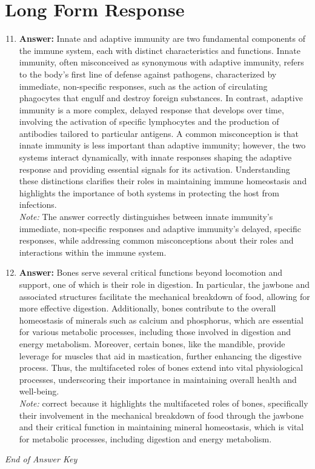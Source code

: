 \documentclass[12pt]{article}
\begin{document}
\section*{Long Form Response}
\begin{enumerate}[label=\arabic*.]
\setcounter{enumi}{10}
\item \textbf{Answer:} Innate and adaptive immunity are two fundamental components of the immune system, each with distinct characteristics and functions. Innate immunity, often misconceived as synonymous with adaptive immunity, refers to the body's first line of defense against pathogens, characterized by immediate, non-specific responses, such as the action of circulating phagocytes that engulf and destroy foreign substances. In contrast, adaptive immunity is a more complex, delayed response that develops over time, involving the activation of specific lymphocytes and the production of antibodies tailored to particular antigens. A common misconception is that innate immunity is less important than adaptive immunity; however, the two systems interact dynamically, with innate responses shaping the adaptive response and providing essential signals for its activation. Understanding these distinctions clarifies their roles in maintaining immune homeostasis and highlights the importance of both systems in protecting the host from infections.
\\ \textit{Note:} The answer correctly distinguishes between innate immunity's immediate, non-specific responses and adaptive immunity's delayed, specific responses, while addressing common misconceptions about their roles and interactions within the immune system.
\item \textbf{Answer:} Bones serve several critical functions beyond locomotion and support, one of which is their role in digestion. In particular, the jawbone and associated structures facilitate the mechanical breakdown of food, allowing for more effective digestion. Additionally, bones contribute to the overall homeostasis of minerals such as calcium and phosphorus, which are essential for various metabolic processes, including those involved in digestion and energy metabolism. Moreover, certain bones, like the mandible, provide leverage for muscles that aid in mastication, further enhancing the digestive process. Thus, the multifaceted roles of bones extend into vital physiological processes, underscoring their importance in maintaining overall health and well-being.
\\ \textit{Note:} correct because it highlights the multifaceted roles of bones, specifically their involvement in the mechanical breakdown of food through the jawbone and their critical function in maintaining mineral homeostasis, which is vital for metabolic processes, including digestion and energy metabolism.
\end{enumerate}

\vfill
\noindent\textit{End of Answer Key}
\end{document}
